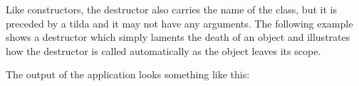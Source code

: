 Like constructors, the destructor also carries the name of the class, but
it is preceded by a tilda and it may not have any arguments. The following
example shows a destructor which simply laments the death of an object and
illustrates how the destructor is called automatically as the object leaves
its scope.

\noindent {\small }

The output of the application looks something like this:


